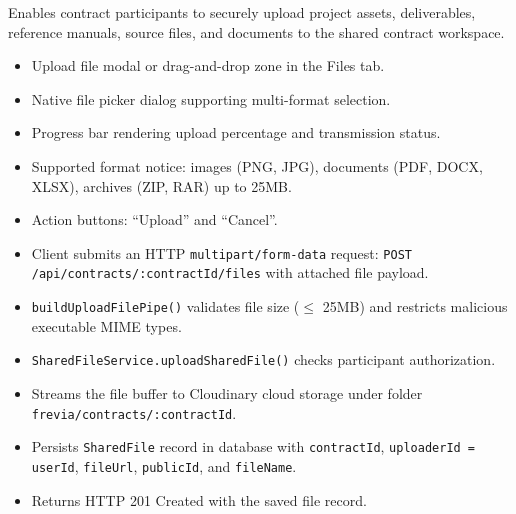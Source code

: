 \noindent Enables contract participants to securely upload project assets, deliverables, reference manuals, source files, and documents to the shared contract workspace.

\begin{itemize}[leftmargin=1.6em,topsep=3pt,itemsep=2pt,parsep=0pt,label=$\bullet$]
      \item Upload file modal or drag-and-drop zone in the Files tab.
      \item Native file picker dialog supporting multi-format selection.
      \item Progress bar rendering upload percentage and transmission status.
      \item Supported format notice: images (PNG, JPG), documents (PDF, DOCX, XLSX), archives (ZIP, RAR) up to 25MB.
      \item Action buttons: ``Upload'' and ``Cancel''.
\end{itemize}

\begin{itemize}[leftmargin=1.6em,topsep=3pt,itemsep=2pt,parsep=0pt,label=$\bullet$]
      \item Client submits an HTTP \texttt{multipart/\allowbreak{}form-\allowbreak{}data} request: \texttt{POST /\allowbreak{}api/\allowbreak{}contracts/\allowbreak{}:\allowbreak{}contractId/\allowbreak{}files} with attached file payload.
      \item \texttt{build\allowbreak{}Upload\allowbreak{}File\allowbreak{}Pipe()} validates file size ($\le$ 25MB) and restricts malicious executable MIME types.
      \item \texttt{Shared\allowbreak{}File\allowbreak{}Service.\allowbreak{}upload\allowbreak{}Shared\allowbreak{}File()} checks participant authorization.
      \item Streams the file buffer to Cloudinary cloud storage under folder \texttt{frevia/\allowbreak{}contracts/\allowbreak{}:\allowbreak{}contractId}.
      \item Persists \texttt{SharedFile} record in database with \texttt{contractId}, \texttt{uploaderId = userId}, \texttt{fileUrl}, \texttt{publicId}, and \texttt{fileName}.
      \item Returns HTTP 201 Created with the saved file record.
\end{itemize}

